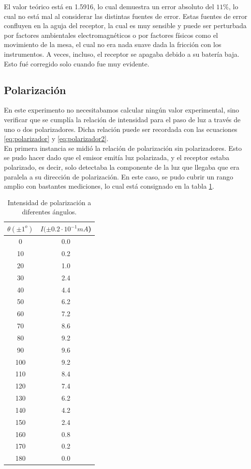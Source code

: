 \documentclass[%
 reprint,
 amsmath,amssymb,
 aps,
]{revtex4-1}
\begin{document}
El valor teórico está en 1.5916, lo cual demuestra un error absoluto del $11\%$, lo cual no está mal al considerar las distintas fuentes de error. Estas fuentes de error confluyen en la aguja del receptor, la cual es muy sensible y puede ser perturbada por factores ambientales electromagnéticos o por factores físicos como el movimiento de la mesa, el cual no era nada suave dada la fricción con los instrumentos. A veces, incluso, el receptor se apagaba debido a su batería baja. Esto fué corregido solo cuando fue muy evidente.\\


\subsection{\label{sec:level2}Polarización}
En este experimento no necesitabamos calcular ningún valor experimental, sino verificar que se cumplía la  relación de intensidad para el paso de luz a través de uno o dos polarizadores. Dicha relación puede ser recordada con las ecuaciones \ref{eq:polarizador} y \ref{eq:polarizador2}.\\

En primera instancia se midió la relación de polarización sin polarizadores. Esto se pudo hacer dado que el emisor emitía luz polarizada, y el receptor estaba polarizado, es decir, solo detectaba la componente de la luz que llegaba que era paralela a su dirección de polarización. En este caso, se pudo cubrir un rango amplio con bastantes mediciones, lo cual está consignado en la tabla \ref{table:polarizador1}.\\

\begin{table}[h!]
\centering
\begin{tabular}{|c|c|}
	\hline $ \theta (\pm 1^o) $ & $ I(\pm 0.2\cdot 10^{-1}mA  $)  \\ 
	\hline\hline
	0  &  0.0\\
	10 &  0.2\\
	20 &  1.0\\ 
	30 &  2.4\\ 
	40 &  4.4\\ 
	50 &  6.2\\ 
	60 &  7.2\\ 
	70 &  8.6\\ 
	80 &  9.2\\ 
	90 &  9.6\\ 
	100 &  9.2\\ 
	110 &  8.4\\ 
	120 &  7.4\\ 
	130 &  6.2\\ 
	140 &  4.2\\ 
	150 &  2.4\\ 
	160 &  0.8\\ 
	170 &  0.2\\ 
	180 &  0.0\\ 
	[1ex] 
 \hline
 \end{tabular} 
  \caption{Intensidad de polarización a diferentes ángulos.}
\label{table:polarizador1} 
\end{table}
\end{document}

